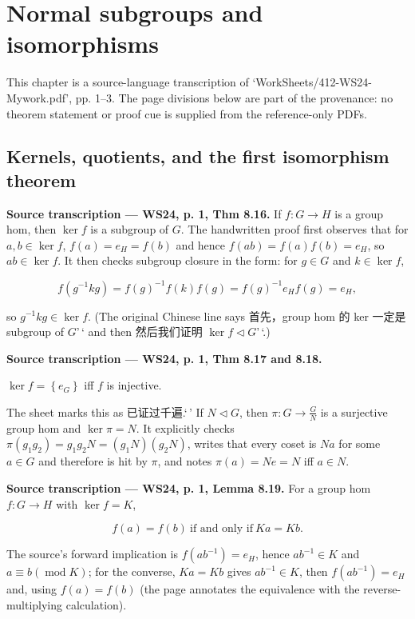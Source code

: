 \chapter{Normal subgroups and isomorphisms}\label{normal-subgroups-and-isomorphisms}

This chapter is a source-language transcription of `WorkSheets/412-WS24-Mywork.pdf', pp. 1--3. The page divisions below are part of the provenance: no theorem statement or proof cue is supplied from the reference-only PDFs.

\section{Kernels, quotients, and the first isomorphism theorem}

\textbf{Source transcription --- WS24, p. 1, Thm 8.16.} If \(f:G\rightarrow H\) is a group hom, then \(\ker f\) is a subgroup of \(G\). The handwritten proof first observes that for \(a,b \in \ker f\), \(f(a) = e_{H} = f(b)\) and hence \(f\left( {ab} \right) = f(a)f(b) = e_{H}\), so \(ab \in \ker f\). It then checks subgroup closure in the form: for \(g \in G\) and \(k \in \ker f\),

\[f\left( {g^{- 1}kg} \right) = {f(g)}^{- 1}f(k)f(g) = {f(g)}^{- 1}e_{H}f(g) = e_{H},\]

so \(g^{- 1}kg \in \ker f\). (The original Chinese line says 首先，group hom 的 ker 一定是 subgroup of \(G\)'\,` and then 然后我们证明 \(\ker f \lhd G\)'\,`.)

\textbf{Source transcription --- WS24, p. 1, Thm 8.17 and 8.18.}

\(\ker f = \left\{ e_{G} \right\}\) iff \(f\) is injective.

The sheet marks this as 已证过千遍.`\,' If \(N \lhd G\), then \(\pi:G\rightarrow\frac{G}{N}\) is a surjective group hom and \(\ker\pi = N\). It explicitly checks \(\pi\left( {g_{1}g_{2}} \right) = g_{1}g_{2}N = \left( {g_{1}N} \right)\left( {g_{2}N} \right)\), writes that every coset is \(Na\) for some \(a \in G\) and therefore is hit by \(\pi\), and notes \(\pi(a) = Ne = N\) iff \(a \in N\).

\textbf{Source transcription --- WS24, p. 1, Lemma 8.19.} For a group hom \(f:G\rightarrow H\) with \(\ker f = K\),

\[f(a) = f(b)\ \text{if and only if}\ Ka = Kb.\]

The source's forward implication is \(f\left( {ab^{- 1}} \right) = e_{H}\), hence \(ab^{- 1} \in K\) and \(a \equiv b\left( {\operatorname{mod}K} \right)\); for the converse, \(Ka = Kb\) gives \(ab^{- 1} \in K\), then \(f\left( {ab^{- 1}} \right) = e_{H}\) and, using \(f(a) = f(b)\) (the page annotates the equivalence with the reverse-multiplying calculation).

